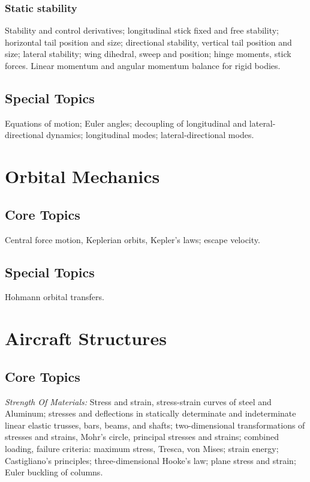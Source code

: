 \subsubsection{Static stability}
Stability and control derivatives; longitudinal stick fixed and free stability; horizontal tail position and size; directional stability, vertical tail position and size; lateral stability; wing dihedral, sweep and position; hinge moments, stick forces. Linear momentum and angular momentum balance for rigid bodies.

\subsection{Special Topics}
Equations of motion; Euler angles; decoupling of longitudinal and lateral-directional dynamics; longitudinal modes; lateral-directional modes.

\section{Orbital Mechanics}

\subsection{Core Topics}
Central force motion, Keplerian orbits, Kepler's laws; escape velocity.

\subsection{Special Topics}
Hohmann orbital transfers.

\section{Aircraft Structures}

\subsection{Core Topics}

\noindent\textit{Strength Of Materials:} Stress and strain, stress-strain curves of steel and Aluminum; stresses and deflections in statically determinate and indeterminate linear elastic trusses, bars, beams, and shafts; two-dimensional transformations of stresses and strains, Mohr's circle, principal stresses and strains; combined loading, failure criteria: maximum stress, Tresca, von Mises; strain energy; Castigliano's principles; three-dimensional Hooke's law; plane stress and strain; Euler buckling of columns.

